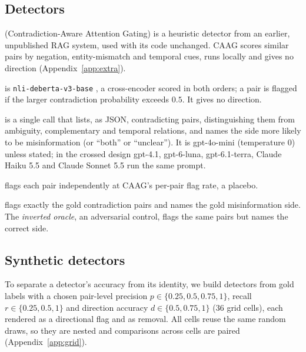 \subsection{Detectors}
\label{sec:detectors}
\begin{description}[leftmargin=0pt,itemsep=1pt,topsep=2pt]
\item[CAAG] (Contradiction-Aware Attention Gating) is a heuristic detector from an earlier, unpublished RAG system,
used with its code unchanged. CAAG scores similar pairs by negation, entity-mismatch and temporal cues, runs locally
and gives no direction (Appendix~\ref{app:extra}).
\item[NLI] is \texttt{nli-deberta-v3-base} \citep{he2023debertav3}, a cross-encoder scored in both orders; a pair is
flagged if the larger contradiction probability exceeds $0.5$. It gives no direction.
\item[LLM] is a single call that lists, as JSON, contradicting pairs, distinguishing them from ambiguity, complementary and
temporal relations, and names the side more likely to be misinformation (or ``both'' or ``unclear''). It is
gpt-4o-mini (temperature 0) unless stated; in the crossed design gpt-4.1, gpt-6-luna, gpt-6.1-terra, Claude Haiku 5.5
and Claude Sonnet 5.5 run the same prompt.
\item[Random] flags each pair independently at CAAG's per-pair flag rate, a placebo.
\item[Oracle] flags exactly the gold contradiction pairs and names the gold misinformation side. The
\emph{inverted oracle}, an adversarial control, flags the same pairs but names the correct side.
\end{description}

\subsection{Synthetic detectors}
\label{sec:synthetic}
To separate a detector's accuracy from its identity, we build detectors from gold labels with a chosen pair-level
precision $p\in\{0.25,0.5,0.75,1\}$, recall $r\in\{0.25,0.5,1\}$ and direction accuracy $d\in\{0.5,0.75,1\}$ (36
grid cells), each rendered as a directional flag and as removal. All cells reuse the same random draws, so they are nested
and comparisons across cells are paired (Appendix~\ref{app:grid}).
